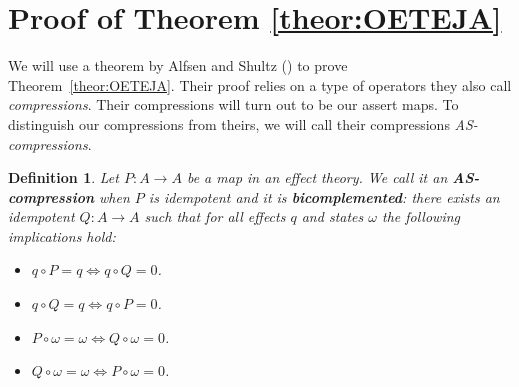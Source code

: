 \documentclass[a4paper,onecolumn,10pt,accepted=2019-05-03, issue=1, volume=1, shorttitle=papers/compositionality-1-1]{compositionalityarticle}
\newcounter{counter}
\numberwithin{counter}{section}
\newtheorem{definition}[counter]{Definition}
\newcommand{\R}{\mathbb{R}}
\begin{document}

\section{Proof of Theorem \ref{theor:OETEJA}} \label{sec:proofofeja}


We will use a theorem by Alfsen and Shultz (\cite[Theorem 9.33]{alfsen2012geometry}) to prove Theorem~\ref{theor:OETEJA}. Their proof relies on a type of operators they also call \emph{compressions}. Their compressions will turn out to be our assert maps. To distinguish our compressions from theirs, we will call their compressions \emph{AS-compressions}.

\begin{definition}
    Let $P:A\rightarrow A$ be a map in an effect theory. We call it an \textbf{AS-compression} when $P$ is idempotent and it is \textbf{bicomplemented}: there exists an idempotent $Q:A\rightarrow A$ such that for all effects $q$ and states $\omega$ the following implications hold:
    \begin{itemize}
        \item $q\circ P = q \iff q\circ Q = 0$.
        \item $q\circ Q = q \iff q\circ P =0$.
        \item $P\circ \omega = \omega \iff Q\circ \omega = 0$.
        \item $Q\circ \omega = \omega \iff P\circ \omega =0$.
    \end{itemize}
\end{definition}
\end{document}
